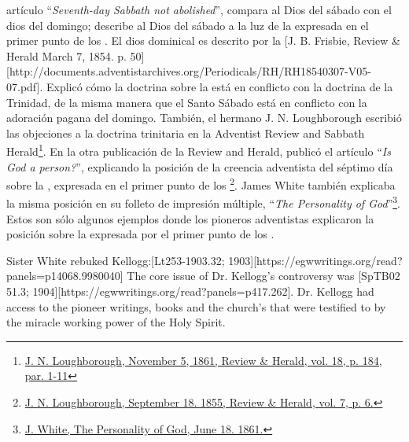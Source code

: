 artículo “\textit{Seventh-day Sabbath not abolished}”, compara al Dios del sábado con el dios del domingo; describe al Dios del sábado a la luz de la  expresada en el primer punto de los . El dios dominical es descrito por la [J. B. Frisbie, Review \& Herald March 7, 1854. p. 50][http://documents.adventistarchives.org/Periodicals/RH/RH18540307-V05-07.pdf]. Explicó cómo la doctrina sobre la  está en conflicto con la doctrina de la Trinidad, de la misma manera que el Santo Sábado está en conflicto con la adoración pagana del domingo. También, el hermano J. N. Loughborough escribió las objeciones a la doctrina trinitaria en la Adventist Review and Sabbath Herald\footnote{\href{https://adventistdigitallibrary.org/adl-349160/advent-review-and-sabbath-herald-november-5-1861}{J. N. Loughborough, November 5, 1861, Review \& Herald, vol. 18, p. 184, par. 1-11}}. En la otra publicación de la Review and Herald, publicó el artículo “\textit{Is God a person?}”, explicando la posición de la creencia adventista del séptimo día sobre la , expresada en el primer punto de los \footnote{\href{http://documents.adventistarchives.org/Periodicals/RH/RH18550918-V07-06.pdf}{J. N. Loughborough, September 18. 1855, Review \& Herald, vol. 7, p. 6.}}. James White también explicaba la misma posición en su folleto de impresión múltiple, “\textit{The Personality of God}”\footnote{\href{https://egwwritings.org/?ref=en_PERGO.1.1&para=1471.3}{J. White, The Personality of God, June 18. 1861.}}. Estos son sólo algunos ejemplos donde los pioneros adventistas explicaron la posición sobre la  expresada por el primer punto de los .


Sister White rebuked Kellogg:[Lt253-1903.32; 1903][https://egwwritings.org/read?panels=p14068.9980040] The core issue of Dr. Kellogg’s controversy was [SpTB02 51.3; 1904][https://egwwritings.org/read?panels=p417.262]. Dr. Kellogg had access to the pioneer writings, books and the church's  that were testified to by the miracle working power of the Holy Spirit.


